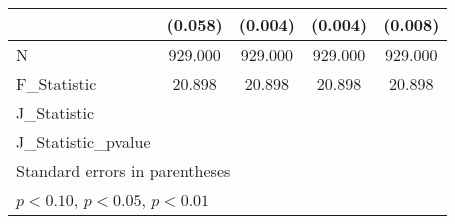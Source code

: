 {\begin{tabular}{l*{4}{c}}
            &     (0.058)         &     (0.004)         &     (0.004)         &     (0.008)         \\
\hline
N           &     929.000         &     929.000         &     929.000         &     929.000         \\
F\_Statistic &      20.898         &      20.898         &      20.898         &      20.898         \\
J\_Statistic &                     &                     &                     &                     \\
J\_Statistic\_pvalue&                     &                     &                     &                     \\
\hline\hline
\multicolumn{5}{l}{\footnotesize Standard errors in parentheses}\\
\multicolumn{5}{l}{\footnotesize \sym{*} \(p<0.10\), \sym{**} \(p<0.05\), \sym{***} \(p<0.01\)}\\
\end{tabular}
}
